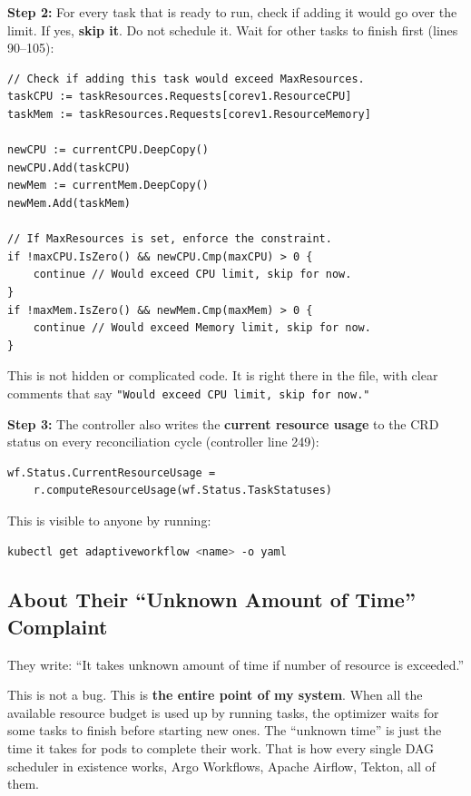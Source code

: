\documentclass[12pt,a4paper]{article}
\begin{document}
\textbf{Step 2:} For every task that is ready to run, check if adding it would go over the limit. If yes, \textbf{skip it}. Do not schedule it. Wait for other tasks to finish first (lines 90--105):

\begin{lstlisting}
// Check if adding this task would exceed MaxResources.
taskCPU := taskResources.Requests[corev1.ResourceCPU]
taskMem := taskResources.Requests[corev1.ResourceMemory]

newCPU := currentCPU.DeepCopy()
newCPU.Add(taskCPU)
newMem := currentMem.DeepCopy()
newMem.Add(taskMem)

// If MaxResources is set, enforce the constraint.
if !maxCPU.IsZero() && newCPU.Cmp(maxCPU) > 0 {
    continue // Would exceed CPU limit, skip for now.
}
if !maxMem.IsZero() && newMem.Cmp(maxMem) > 0 {
    continue // Would exceed Memory limit, skip for now.
}
\end{lstlisting}

This is not hidden or complicated code. It is right there in the file, with clear comments that say \texttt{"Would exceed CPU limit, skip for now."}

\textbf{Step 3:} The controller also writes the \textbf{current resource usage} to the CRD status on every reconciliation cycle (controller line 249):

\begin{lstlisting}
wf.Status.CurrentResourceUsage =
    r.computeResourceUsage(wf.Status.TaskStatuses)
\end{lstlisting}

This is visible to anyone by running:
\begin{lstlisting}[language=bash]
kubectl get adaptiveworkflow <name> -o yaml
\end{lstlisting}

\subsection{About Their ``Unknown Amount of Time'' Complaint}

They write: ``It takes unknown amount of time if number of resource is exceeded.''

This is not a bug. This is \textbf{the entire point of my system}. When all the available resource budget is used up by running tasks, the optimizer waits for some tasks to finish before starting new ones. The ``unknown time'' is just the time it takes for pods to complete their work. That is how every single DAG scheduler in existence works, Argo Workflows, Apache Airflow, Tekton, all of them.
\end{document}
